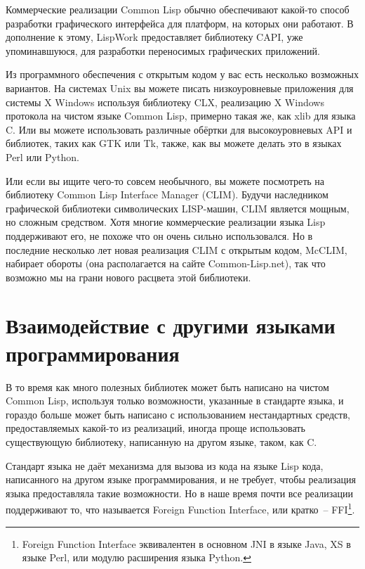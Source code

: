 Коммерческие реализации Common Lisp обычно обеспечивают какой-то способ разработки
графического интерфейса для платформ, на которых они работают. В дополнение к этому,
LispWork предоставляет библиотеку CAPI, уже упоминавшуюся, для разработки переносимых
графических приложений.

Из программного обеспечения с открытым кодом у вас есть несколько возможных вариантов. На
системах Unix вы можете писать низкоуровневые приложения для системы X Windows используя
библиотеку CLX, реализацию X Windows протокола на чистом языке Common Lisp, примерно такая
же, как xlib для языка C. Или вы можете использовать различные обёртки для высокоуровневых
API и библиотек, таких как GTK или Tk, также, как вы можете делать это в языках Perl или
Python.

Или если вы ищите чего-то совсем необычного, вы можете посмотреть на библиотеку Common
Lisp Interface Manager (CLIM). Будучи наследником графической библиотеки символических
LISP-машин, CLIM является мощным, но сложным средством. Хотя многие коммерческие
реализации языка Lisp поддерживают его, не похоже что он очень сильно использовался. Но в
последние несколько лет новая реализация CLIM с открытым кодом, McCLIM, набирает обороты
(она располагается на сайте Common-Lisp.net), так что возможно мы на грани нового расцвета
этой библиотеки.

\section{Взаимодействие с другими языками программирования}

В то время как много полезных библиотек может быть написано на чистом Common Lisp,
используя только возможности, указанные в стандарте языка, и гораздо больше может быть
написано с использованием нестандартных средств, предоставляемых какой-то из реализаций,
иногда проще использовать существующую библиотеку, написанную на другом языке, таком, как
C.

Стандарт языка не даёт механизма для вызова из кода на языке Lisp кода, написанного на
другом языке программирования, и не требует, чтобы реализация языка предоставляла такие
возможности. Но в наше время почти все реализации поддерживают то, что называется Foreign
Function Interface, или кратко~-- FFI\footnote{Foreign Function Interface эквивалентен в
  основном JNI в языке Java, XS в языке Perl, или модулю расширения языка Python.}.

